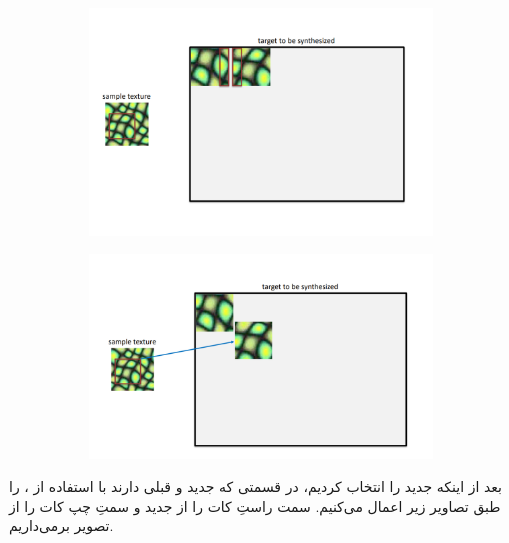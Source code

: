 \documentclass[a4paper,12pt]{article}
\begin{document}
 \begin{figure}[H]
 	\centering
 	\begin{subfigure}{0.5\textwidth}
 		\centering
 		\includegraphics[width=.9\textwidth]{4.png}
 	\end{subfigure}%
	 \begin{subfigure}{0.5\textwidth}
	 	\centering
	 	\includegraphics[width=.9\textwidth]{3.png}
	 \end{subfigure}%
 \end{figure}
بعد از اینکه 
جدید را انتخاب کردیم، در قسمتی که 
جدید و 
قبلی 
دارند با استفاده از 
،
را طبق تصاویر زیر اعمال می‌کنیم. سمت راستِ کات را از 
 جدید و سمتِ چپ کات را از تصویر 
 بر‌می‌داریم.
\end{document}
